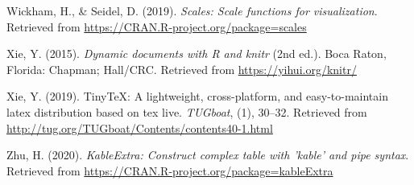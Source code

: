 \documentclass[
  english,
  man]{apa6}
\begin{document}
\leavevmode\hypertarget{ref-R-scales}{}%
Wickham, H., \& Seidel, D. (2019). \emph{Scales: Scale functions for visualization}. Retrieved from \url{https://CRAN.R-project.org/package=scales}

\leavevmode\hypertarget{ref-R-knitr}{}%
Xie, Y. (2015). \emph{Dynamic documents with R and knitr} (2nd ed.). Boca Raton, Florida: Chapman; Hall/CRC. Retrieved from \url{https://yihui.org/knitr/}

\leavevmode\hypertarget{ref-R-tinytex}{}%
Xie, Y. (2019). TinyTeX: A lightweight, cross-platform, and easy-to-maintain latex distribution based on tex live. \emph{TUGboat}, (1), 30--32. Retrieved from \url{http://tug.org/TUGboat/Contents/contents40-1.html}

\leavevmode\hypertarget{ref-R-kableExtra}{}%
Zhu, H. (2020). \emph{KableExtra: Construct complex table with 'kable' and pipe syntax}. Retrieved from \url{https://CRAN.R-project.org/package=kableExtra}

\endgroup


\clearpage
\theendnotes
\end{document}
